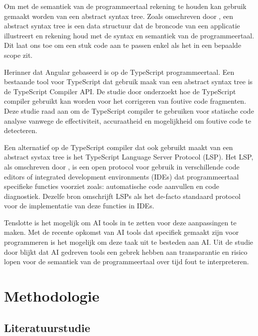 Om met de semantiek van de programmeertaal rekening te houden kan gebruik gemaakt worden van een abstract syntax tree.
Zoals omschreven door \textcite{Sun2023}, een abstract syntax tree is een data structuur dat de broncode van een applicatie illustreert en rekening houd met de syntax en semantiek van de programmeertaal.
Dit laat ons toe om een stuk code aan te passen enkel als het in een bepaalde scope zit.

Herinner dat Angular gebaseerd is op de TypeScript programmeertaal.
Een bestaande tool voor TypeScript dat gebruik maak van een abstract syntax tree is de TypeScript Compiler API.
De studie door \textcite{Reid2023} onderzoekt hoe de TypeScript compiler gebruikt kan worden voor het corrigeren van foutive code fragmenten. 
Deze studie raad aan om de TypeScript compiler te gebruiken voor statische code analyse vanwege de effectiviteit, accuraatheid en mogelijkheid om foutive code te detecteren.

Een alternatief op de TypeScript compiler dat ook gebruikt maakt van een abstract systax tree is het TypeScript Language Server Protocol (LSP).
Het LSP, als omschreven door \textcite{Bork2023}, is een open protocol voor gebruik in verschillende code editors of integrated development environments (IDEs) dat programmeertaal specifieke functies voorziet zoals: automatische code aanvullen en code diagnostiek. 
Dezelfe bron omschrijft LSPs als het de-facto standaard protocol voor de implementatie van deze functies in IDEs.

Tenslotte is het mogelijk om AI tools in te zetten voor deze aanpassingen te maken.
Met de recente opkomst van AI tools dat specifiek gemaakt zijn voor programmeren is het mogelijk om deze taak uit te besteden aan AI.
Uit de studie door \textcite{Hodovychenko2025} blijkt dat AI gedreven tools een gebrek hebben aan transparantie en risico lopen voor de semantiek van de programmeertaal over tijd fout te interpreteren.

\section{Methodologie}
\label{sec:methodologie}

\subsection{Literatuurstudie}
\label{sec:methodologie:literatuurstudie}

